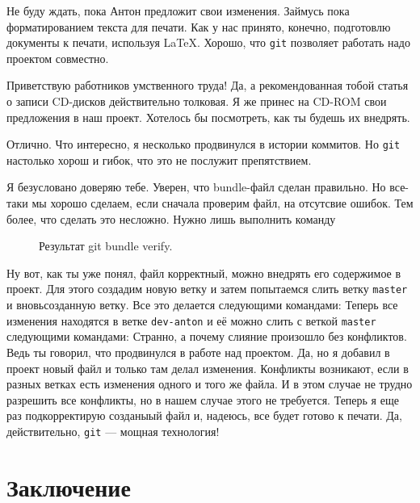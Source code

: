 \documentclass[14pt,a4paper]{article}
\begin{document}

 Не буду ждать, пока Антон предложит свои изменения. Займусь
пока форматированием текста для печати. Как у нас принято, конечно, подготовлю документы к печати,
используя \LaTeX. Хорошо, что \texttt{git} позволяет работать надо проектом совместно. 

 

 Приветствую работников умственного труда! Да, а рекомендованная тобой статья о записи
CD-дисков действительно толковая. Я же принес на CD-ROM свои предложения в наш проект. Хотелось бы 
посмотреть, как ты будешь их внедрять. 

 Отлично. Что интересно, я несколько продвинулся в истории коммитов. Но \texttt{git} 
настолько хорош и гибок, что это не послужит  препятствием. 


Я безусловано доверяю тебе. Уверен, что bundle-файл сделан правильно. Но все-таки 
мы хорошо сделаем, если сначала проверим файл, на отсутсвие ошибок. Тем более, что сделать это
несложно. Нужно лишь выполнить команду
\begin{figure}
	\centering
	\caption{Результат git bundle verify.}
	\label{pic-result-verify}
\end{figure}

Ну вот, как ты уже понял, файл корректный, можно внедрять его содержимое в проект.
Для этого создадим новую ветку и затем попытаемся слить ветку \texttt{master} и вновьсозданную ветку.
Все это делается следующими командами:
Теперь все изменения находятся в ветке \texttt{dev-anton} и её можно слить с веткой \texttt{master}
следующими командами:
 Странно, а почему слияние произошло без конфликтов. Ведь ты говорил, что продвинулся
в работе над проектом. 
 Да, но я добавил в проект новый файл и только там делал изменения. Конфликты
возникают, если в разных ветках есть изменения одного и того же файла. И в этом случае не трудно
разрешить все конфликты, но в нашем случае этого не требуется. Теперь я еще раз подкорректирую 
созданыый файл и, надеюсь, все будет готово к печати.
 Да, действительно, \texttt{git} --- мощная технология!
\section{Заключение}
\end{document}
